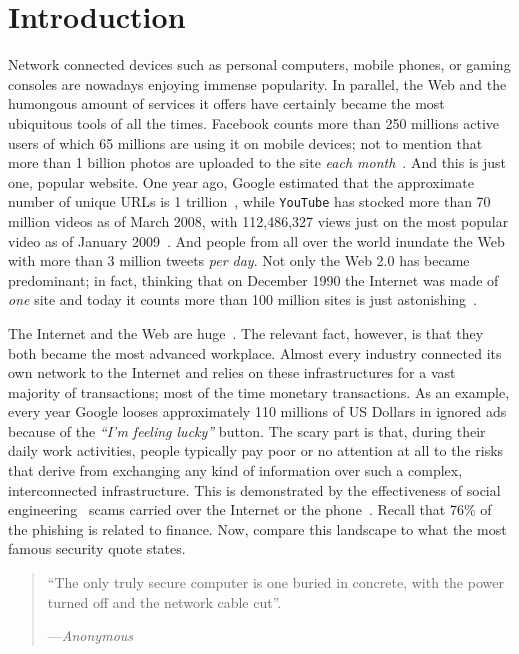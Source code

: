 \chapter{Introduction}
\label{introduction}

Network connected devices such as personal computers, mobile phones,
or gaming consoles are nowadays enjoying immense popularity. In
parallel, the Web and the humongous amount of services it offers have
certainly became the most ubiquitous tools of all the
times. \textsf{Facebook} counts more than 250 millions active users of
which 65 millions are using it on mobile devices; not to mention that
more than 1 billion photos are uploaded to the site \emph{each
  month}~\citep{facebook-stats}. And this is just one, popular
website. One year ago, \textsf{Google} estimated that the approximate
number of unique \acp{URL} is 1
trillion~\citep{google-is-big}, while \texttt{YouTube} has stocked
more than 70 million videos as of March 2008, with 112,486,327 views
just on the most popular video as of January
2009~\citep{social-media-stats}. And people from all over the world
inundate the Web with more than 3 million tweets \emph{per day}. Not
only the Web 2.0 has became predominant; in fact, thinking that on
December 1990 the Internet was made of \emph{one} site and today it
counts more than 100 million sites is just
astonishing~\citep{internet-timeline}.

The Internet and the Web are huge~\citep{inetworldstats}. The relevant
fact, however, is that they both became the most advanced
workplace. Almost every industry connected its own network to the
Internet and relies on these infrastructures for a vast majority of
transactions; most of the time monetary transactions. As an example,
every year \textsf{Google} looses approximately 110 millions of US
Dollars in ignored ads because of the \emph{``I'm feeling lucky''}
button. The scary part is that, during their daily work activities,
people typically pay poor or no attention at all to the risks that
derive from exchanging any kind of information over such a complex,
interconnected infrastructure. This is demonstrated by the
effectiveness of social engineering~\citep{deception} scams carried
over the Internet or the
phone~\citep{social-engineering-fundamentals}. Recall that 76\% of the
phishing is related to finance. Now, compare this landscape to what
the most famous security quote states.

\begin{quotation}
  ``The only truly secure computer is one buried in concrete, with the
  power turned off and the network cable cut''.

  ---\emph{Anonymous}
\end{quotation}

